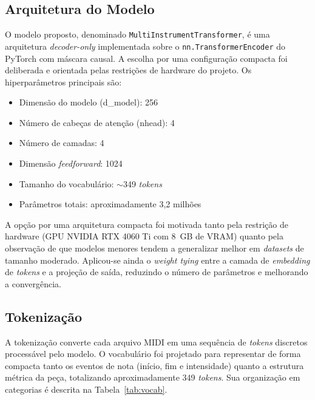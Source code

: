 \documentclass[12pt]{article}
\begin{document}
\subsection{Arquitetura do Modelo}

O modelo proposto, denominado \texttt{MultiInstrumentTransformer}, é uma
arquitetura \emph{decoder-only} implementada sobre o \texttt{nn.TransformerEncoder}
do PyTorch com máscara causal. A escolha por uma configuração compacta foi
deliberada e orientada pelas restrições de hardware do projeto. Os
hiperparâmetros principais são:

\begin{itemize}
  \item Dimensão do modelo (d\_model): 256
  \item Número de cabeças de atenção (nhead): 4
  \item Número de camadas: 4
  \item Dimensão \emph{feedforward}: 1024
  \item Tamanho do vocabulário: $\sim$349 \emph{tokens}
  \item Parâmetros totais: aproximadamente 3,2 milhões
\end{itemize}

A opção por uma arquitetura compacta foi motivada tanto pela restrição de hardware
(GPU NVIDIA RTX 4060 Ti com 8~GB de VRAM) quanto pela observação de que modelos
menores tendem a generalizar melhor em \emph{datasets} de tamanho moderado.
Aplicou-se ainda o \emph{weight tying} entre a camada de \emph{embedding} de
\emph{tokens} e a projeção de saída, reduzindo o número de parâmetros e melhorando
a convergência.

\subsection{Tokenização}

A tokenização converte cada arquivo MIDI em uma sequência de \emph{tokens}
discretos processável pelo modelo. O vocabulário foi projetado para representar de
forma compacta tanto os eventos de nota (início, fim e intensidade) quanto a
estrutura métrica da peça, totalizando aproximadamente 349 \emph{tokens}. Sua
organização em categorias é descrita na Tabela~\ref{tab:vocab}.
\end{document}
